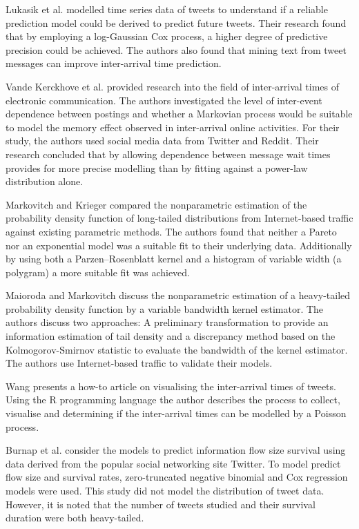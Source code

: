 Lukasik et al. \cite{lukasik2015modeling} modelled time series data of tweets to understand if a reliable prediction model could be derived to predict future tweets. Their research found that by employing a log-Gaussian Cox process, a higher degree of predictive precision could be achieved. The authors also found that mining text from tweet messages can improve inter-arrival time prediction.

Vande Kerckhove et al. \cite{vande2015markov} provided research into the field of inter-arrival times of electronic communication. The authors investigated the level of inter-event dependence between postings and whether a Markovian process would be suitable to model the memory effect observed in inter-arrival online activities. For their study, the authors used social media data from Twitter and Reddit. Their research concluded that by allowing dependence between message wait times provides for more precise modelling than by fitting against a power-law distribution alone.

Markovitch and Krieger \cite{markovitch2000nonparametric} compared the nonparametric estimation of the probability density function of long-tailed distributions from Internet-based traffic against existing parametric methods. The authors found that neither a Pareto nor an exponential model was a suitable fit to their underlying data. Additionally by using both a Parzen--Rosenblatt kernel and a histogram of variable width (a polygram) a more suitable fit was achieved.

Maioroda and Markovitch \cite{maiboroda2004estimation} discuss the nonparametric estimation of a heavy-tailed probability density function by a variable bandwidth kernel estimator. The authors discuss two approaches: A preliminary transformation to provide an information estimation of tail density and a discrepancy method based on the Kolmogorov-Smirnov statistic to evaluate the bandwidth of the kernel estimator. The authors use Internet-based traffic to validate their models.

Wang \cite{viztweettimes} presents a how-to article on visualising the inter-arrival times of tweets. Using the R programming language the author describes the process to collect, visualise and determining if the inter-arrival times can be modelled by a Poisson process.

Burnap et al. \cite{burnap2014tweeting} consider the models to predict information flow size survival using data derived from the popular social networking site Twitter. To model predict flow size and survival rates, zero-truncated negative binomial and Cox regression models were used. This study did not model the distribution of tweet data. However, it is noted that the number of tweets studied and their survival duration were both heavy-tailed. 


